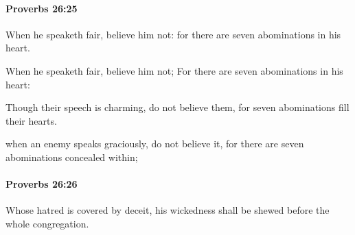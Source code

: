 		\paragraph{Proverbs 26:25} %
			\label{PROVERBS-26-25}

			When he speaketh fair, believe him not: for there are seven abominations in his heart.

			\begin{versebox}
					\item[BHS] 
					\item[ASV] When he speaketh fair, believe him not; For there are seven abominations in his heart:
					\item[NIV] Though their speech is charming, do not believe them, for seven abominations fill their hearts.
					\item[NRSV] when an enemy speaks graciously, do not believe it, for there are seven abominations concealed within;
			\end{versebox}

		\paragraph{Proverbs 26:26} %
			\label{PROVERBS-26-26}

			Whose hatred is covered by deceit, his wickedness shall be shewed before the whole congregation.

